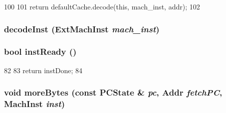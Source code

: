 \begin{DoxyCode}
100     {
101         return defaultCache.decode(this, mach_inst, addr);
102     }
\end{DoxyCode}
\hypertarget{classAlphaISA_1_1Decoder_a148768e0e9062eb41f604040d0ea86e6}{
\subsubsection[{decodeInst}]{ decodeInst ({\bf ExtMachInst} {\em mach\_\-inst})}}
\label{classAlphaISA_1_1Decoder_a148768e0e9062eb41f604040d0ea86e6}
\hypertarget{classAlphaISA_1_1Decoder_a9f6a0bc8946ca58d5d59a5dbc6a3181f}{
\subsubsection[{instReady}]{\setlength{\rightskip}{0pt plus 5cm}bool instReady ()}}
\label{classAlphaISA_1_1Decoder_a9f6a0bc8946ca58d5d59a5dbc6a3181f}



\begin{DoxyCode}
82     {
83         return instDone;
84     }
\end{DoxyCode}
\hypertarget{classAlphaISA_1_1Decoder_a85a99c8dd9425508bee9a17836dbbd12}{
\subsubsection[{moreBytes}]{\setlength{\rightskip}{0pt plus 5cm}void moreBytes (const {\bf PCState} \& {\em pc}, \/  {\bf Addr} {\em fetchPC}, \/  {\bf MachInst} {\em inst})}}
\label{classAlphaISA_1_1Decoder_a85a99c8dd9425508bee9a17836dbbd12}



